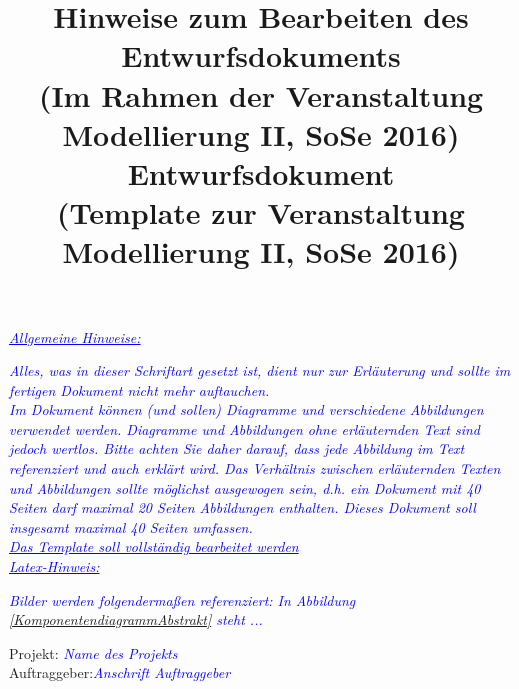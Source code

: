 \documentclass[includeheaders]{scrartcl}
\begin{document}

\setlength{\parindent}{0pt}

\title{Hinweise zum Bearbeiten des Entwurfsdokuments\\ \small{(Im Rahmen der Veranstaltung Modellierung II, SoSe 2016)}
}
\date{}
\author{}
\maketitle
\textcolor{blue}{\itshape{\underline{Allgemeine Hinweise:}}}

\textcolor{blue}{\itshape{Alles, was in dieser Schriftart gesetzt ist, dient nur zur Erläuterung und sollte im fertigen Dokument nicht mehr auftauchen.}}
\\

\textcolor{blue}{\itshape{Im Dokument können (und sollen) Diagramme und verschiedene Abbildungen verwendet werden. Diagramme und Abbildungen ohne erläuternden Text sind jedoch wertlos. Bitte achten Sie daher darauf, dass jede Abbildung im Text referenziert und auch erklärt wird. Das Verhältnis zwischen erläuternden Texten und  Abbildungen sollte möglichst ausgewogen sein, d.h. ein Dokument mit 40 Seiten darf maximal 20 Seiten Abbildungen enthalten. Dieses Dokument soll insgesamt maximal 40 Seiten umfassen.}}
\\

\textcolor{blue}{\itshape{\underline{Das Template soll vollständig bearbeitet werden}}}
\\

\textcolor{blue}{\itshape{\underline{Latex-Hinweis:}}}

\textcolor{blue}{\itshape{Bilder werden folgendermaßen referenziert: In Abbildung \ref{KomponentendiagrammAbstrakt} steht ...}}

\newpage

\newpage 

\title{Entwurfsdokument\\ \small{(Template zur Veranstaltung Modellierung II, SoSe 2016)}}
\date{}
\author{}

\maketitle

Projekt:	\textcolor{blue}{\itshape{Name des Projekts}}\\

Auftraggeber:\textcolor{blue}{\itshape{Anschrift Auftraggeber}}\\
\end{document}
